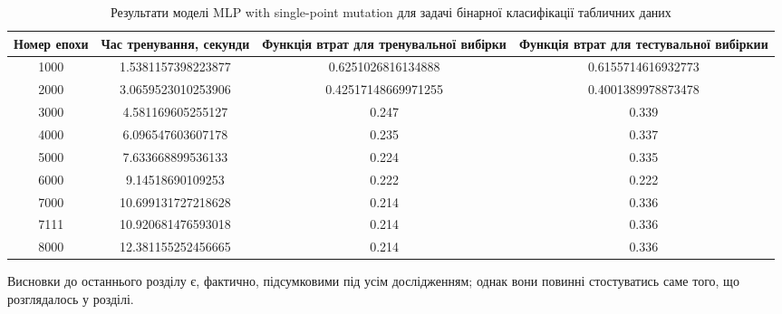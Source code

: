\begin{table}[ht]
	\caption{Результати моделі MLP with single-point mutation для задачі бінарної класифікації табличних даних}
	\label{mlp_spm_bc_td_results}
	\centering
	\begin{adjustbox}{max width=\textwidth}
		\begin{tabular}{|c|c|c|c|}
			\hline 
			Номер епохи & Час тренування, секунди & Функція втрат для тренувальної вибірки & Функція втрат для тестувальної вибіркии \\
			\hline 
			1000 & 1.5381157398223877 & 0.6251026816134888 & 0.6155714616932773 \\
			\hline 
			2000 & 3.0659523010253906 & 0.42517148669971255 & 0.4001389978873478 \\
			\hline
			3000 & 4.581169605255127 & 0.247 & 0.339 \\
			\hline
			4000 & 6.096547603607178 & 0.235 & 0.337 \\
			\hline
			5000 & 7.633668899536133 & 0.224 & 0.335 \\
			\hline
			6000 & 9.14518690109253 & 0.222 & 0.222 \\
			\hline
			7000 & 10.699131727218628 & 0.214 & 0.336 \\
			\hline
			7111 & 10.920681476593018 & 0.214 & 0.336 \\
			\hline
			8000 & 12.381155252456665 & 0.214 & 0.336 \\
			\hline
		\end{tabular}
	\end{adjustbox}
\end{table}

\chapconclude{\ref{chap:practice}}

Висновки до останнього розділу є, фактично, підсумковими під усім 
дослідженням; однак вони повинні стостуватись саме того, що розглядалось у 
розділі.